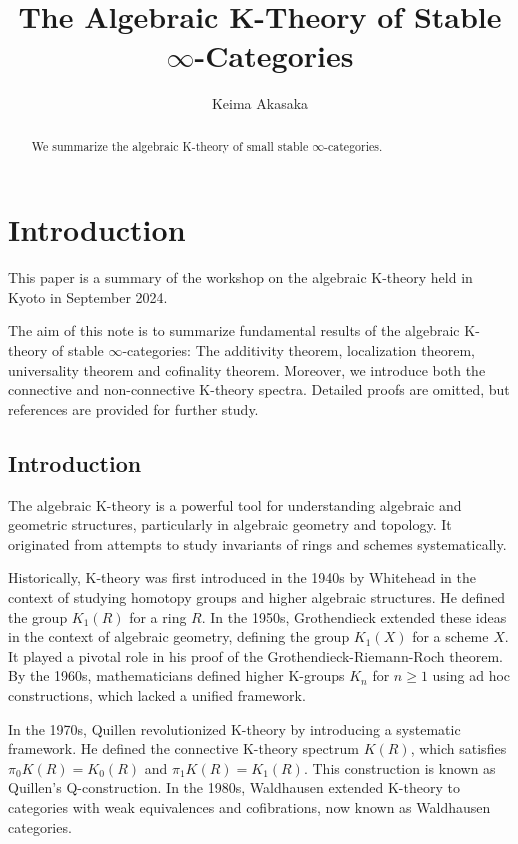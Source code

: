 \documentclass[a4paper,dvipdfmx,11pt,reqno]{amsart}
\title{The Algebraic K-Theory of Stable \texorpdfstring{$\infty$}{infty}-Categories}
\author{Keima Akasaka}
\theoremstyle{definition}
\begin{document}
\maketitle 

\begin{abstract}
  We summarize the algebraic K-theory of small stable $\infty$-categories.
\end{abstract} 

\setcounter{tocdepth}{1}
\tableofcontents   


\section{Introduction}

This paper is a summary of the workshop on the algebraic K-theory held in Kyoto in September 2024.

The aim of this note is to summarize fundamental results of the algebraic K-theory of stable $\infty$-categories:
The additivity theorem, localization theorem, universality theorem and cofinality theorem.
Moreover, we introduce both the connective and non-connective K-theory spectra.
Detailed proofs are omitted, but references are provided for further study.

\subsection{Introduction}

The algebraic K-theory is a powerful tool for understanding algebraic and geometric structures, particularly in algebraic geometry and topology. 
It originated from attempts to study invariants of rings and schemes systematically.

Historically, K-theory was first introduced in the 1940s by Whitehead in the context of studying homotopy groups and higher algebraic structures. 
He defined the group $K_1(R)$ for a ring $R$.
In the 1950s, Grothendieck extended these ideas in the context of algebraic geometry, defining the group $K_1(X)$ for a scheme $X$.
It played a pivotal role in his proof of the Grothendieck-Riemann-Roch theorem.
By the 1960s, mathematicians defined higher K-groups $K_n$ for $n \geq 1$ using ad hoc constructions, which lacked a unified framework.

In the 1970s, Quillen revolutionized K-theory by introducing a systematic framework. 
He defined the connective K-theory spectrum $K(R)$, which satisfies $\pi_0K(R)= K_0(R)$ and $\pi_1K(R) = K_1(R)$.
This construction is known as Quillen's Q-construction.
In the 1980s, Waldhausen extended K-theory to categories with weak equivalences and cofibrations, now known as Waldhausen categories. 
\end{document}
